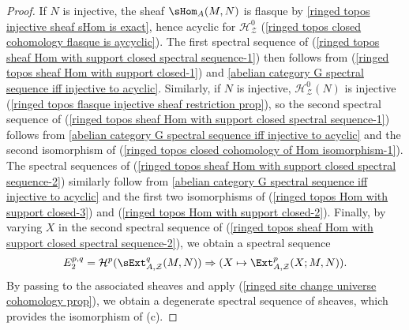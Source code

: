 \begin{proof}
If $N$ is injective, the sheaf $\sHom_A(M,N)$ is flasque by \cref{ringed topos injective sheaf sHom is exact}, hence acyclic for $\mathcal{H}^0_\mathcal{Z}$ (\cref{ringed topos closed cohomology flasque is aycyclic}). The first spectral sequence of (\ref{ringed topos sheaf Hom with support closed spectral sequence-1}) then follows from (\ref{ringed topos sheaf Hom with support closed-1}) and \cref{abelian category G spectral sequence iff injective to acyclic}. Similarly, if $N$ is injective, $\mathcal{H}_\mathcal{Z}^0(N)$ is injective (\cref{ringed topos flasque injective sheaf restriction prop}), so the second spectral sequence of (\ref{ringed topos sheaf Hom with support closed spectral sequence-1}) follows from \cref{abelian category G spectral sequence iff injective to acyclic} and the second isomorphism of (\ref{ringed topos closed cohomology of Hom isomorphism-1}). The spectral sequences of (\ref{ringed topos sheaf Hom with support closed spectral sequence-2}) similarly follow from \cref{abelian category G spectral sequence iff injective to acyclic} and the first two isomorphisms of (\ref{ringed topos Hom with support closed-3}) and (\ref{ringed topos Hom with support closed-2}). Finally, by varying $X$ in the second spectral sequence of (\ref{ringed topos sheaf Hom with support closed spectral sequence-2}), we obtain a spectral sequence
\[E_2^{p,q}=\mathcal{H}^p(\sExt_{A,\mathcal{Z}}^q(M,N))\Rightarrow (X\mapsto \Ext_{A,\mathcal{Z}}^p(X;M,N)).\]
By passing to the associated sheaves and apply (\ref{ringed site change universe cohomology prop}), we obtain a degenerate spectral sequence of sheaves, which provides the isomorphism of (c).
\end{proof}

